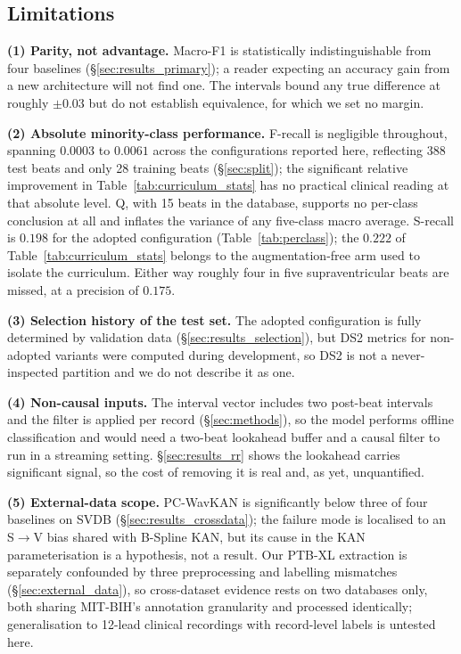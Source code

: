 \documentclass[journal,twoside,web]{ieeecolor}
\begin{document}
\subsection{Limitations}
\label{sec:limitations}
\noindent\textbf{(1) Parity, not advantage.} Macro-F1 is statistically indistinguishable from four baselines (\S\ref{sec:results_primary}); a reader expecting an accuracy gain from a new architecture will not find one. The intervals bound any true difference at roughly $\pm0.03$ but do not establish equivalence, for which we set no margin.

\noindent\textbf{(2) Absolute minority-class performance.} F-recall is negligible throughout, spanning $0.0003$ to $0.0061$ across the configurations reported here, reflecting 388 test beats and only 28 training beats (\S\ref{sec:split}); the significant relative improvement in Table~\ref{tab:curriculum_stats} has no practical clinical reading at that absolute level. Q, with 15 beats in the database, supports no per-class conclusion at all and inflates the variance of any five-class macro average. S-recall is $0.198$ for the adopted configuration (Table~\ref{tab:perclass}); the $0.222$ of Table~\ref{tab:curriculum_stats} belongs to the augmentation-free arm used to isolate the curriculum. Either way roughly four in five supraventricular beats are missed, at a precision of $0.175$.

\noindent\textbf{(3) Selection history of the test set.} The adopted configuration is fully determined by validation data (\S\ref{sec:results_selection}), but DS2 metrics for non-adopted variants were computed during development, so DS2 is not a never-inspected partition and we do not describe it as one.

\noindent\textbf{(4) Non-causal inputs.} The interval vector includes two post-beat intervals and the filter is applied per record (\S\ref{sec:methods}), so the model performs offline classification and would need a two-beat lookahead buffer and a causal filter to run in a streaming setting. \S\ref{sec:results_rr} shows the lookahead carries significant signal, so the cost of removing it is real and, as yet, unquantified.

\noindent\textbf{(5) External-data scope.} PC-WavKAN is significantly below three of four baselines on SVDB (\S\ref{sec:results_crossdata}); the failure mode is localised to an S$\rightarrow$V bias shared with B-Spline KAN, but its cause in the KAN parameterisation is a hypothesis, not a result. Our PTB-XL extraction is separately confounded by three preprocessing and labelling mismatches (\S\ref{sec:external_data}), so cross-dataset evidence rests on two databases only, both sharing MIT-BIH's annotation granularity and processed identically; generalisation to 12-lead clinical recordings with record-level labels is untested here.
\end{document}
